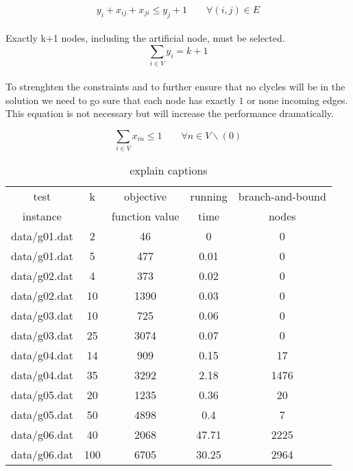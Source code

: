 \begin{equation}
 y_{i} + x_{ij} + x_{ji} \leq y_{j} + 1 \qquad \forall (i,j) \in E
 \label{lbl:xy3}
\end{equation}
\\
Exactly k+1 nodes, including the artificial node, must be selected.
\begin{equation}
  \sum_{i \in V} y_i = k + 1
  \label{lbl:yk}
\end{equation}
\\
To strenghten the constraints and to further ensure that no clycles will be in the solution we need to go sure that each node has exactly $1$ or none incoming edges. This equation is not necessary but will increase the performance dramatically.

\begin{equation}
  \sum_{i \in V} {x_{in}} \leq 1 \qquad \forall n \in V \backslash (0)
\end{equation}


\begin{table} 
\small
\centering
\begin{tabular}{ccccc}
\hline
test     & k & objective      & running & branch-and-bound \\
instance &   & function value & time    & nodes \\
\hline
data/g01.dat		& 2	& 46	& 0	& 0	\\ 
data/g01.dat		& 5	& 477	& 0.01	& 0	\\ 
data/g02.dat		& 4	& 373	& 0.02	& 0	\\ 
data/g02.dat		& 10	& 1390	& 0.03	& 0	\\ 
data/g03.dat		& 10	& 725	& 0.06	& 0	\\ 
data/g03.dat		& 25	& 3074	& 0.07	& 0	\\ 
data/g04.dat		& 14	& 909	& 0.15	& 17	\\ 
data/g04.dat		& 35	& 3292	& 2.18	& 1476	\\ 
data/g05.dat		& 20	& 1235	& 0.36	& 20	\\ 
data/g05.dat		& 50	& 4898	& 0.4	& 7	\\ 
data/g06.dat		& 40	& 2068	& 47.71	& 2225	\\ 
data/g06.dat		& 100	& 6705	& 30.25	& 2964	\\ 

\hline
\end{tabular}
\caption{explain captions}
\label{tbl:scf_fast}
\end{table}

